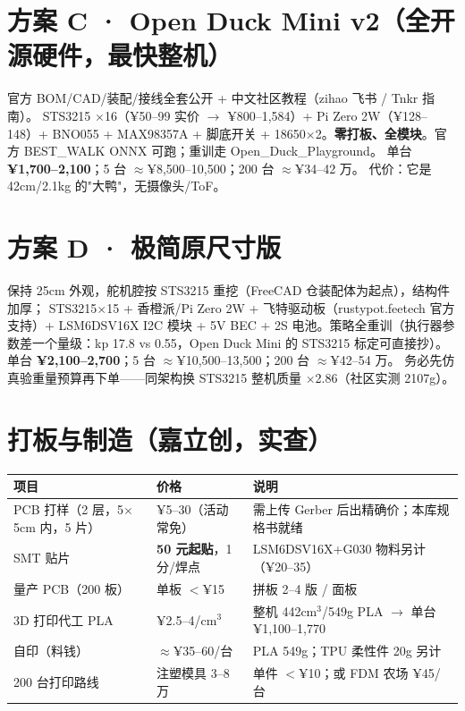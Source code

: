 \documentclass[11pt,a4paper]{ctexart}
\newcommand{\warn}[1]{\textcolor{orange!85!black}{#1}}
\begin{document}
\section{方案 C · Open Duck Mini v2（全开源硬件，最快整机）}

官方 BOM/CAD/装配/接线全套公开 + 中文社区教程（zihao 飞书 / Tnkr 指南）。
STS3215 $\times$16（¥50--99 实价 $\to$ ¥800--1,584）+ Pi Zero 2W（¥128--148）+ BNO055 + MAX98357A +
脚底开关 + 18650$\times$2。\textbf{零打板、全模块}。官方 BEST\_WALK ONNX 可跑；重训走 Open\_Duck\_Playground。
单台 \textbf{¥1,700--2,100}；5 台 $\approx$¥8,500--10,500；200 台 $\approx$¥34--42 万。
代价：它是 42cm/2.1kg 的"大鸭"，无摄像头/ToF。

\section{方案 D · 极简原尺寸版}

保持 25cm 外观，舵机腔按 STS3215 重挖（FreeCAD 仓装配体为起点），结构件加厚；
STS3215$\times$15 + 香橙派/Pi Zero 2W + 飞特驱动板（rustypot.feetech 官方支持）+ LSM6DSV16X I2C 模块 +
5V BEC + 2S 电池。策略全重训（执行器参数差一个量级：kp 17.8 vs 0.55，Open Duck Mini 的
STS3215 标定可直接抄）。单台 \textbf{¥2,100--2,700}；5 台 $\approx$¥10,500--13,500；200 台 $\approx$¥42--54 万。
\warn{务必先仿真验重量预算再下单}——同架构换 STS3215 整机质量 $\times$2.86（社区实测 2107g）。

\section{打板与制造（嘉立创，实查）}

\begin{longtable}{L{5.2cm}L{4.2cm}L{5.4cm}}
\toprule
\textbf{项目} & \textbf{价格} & \textbf{说明} \\
\midrule
PCB 打样（2 层，5$\times$5cm 内，5 片） & ¥5--30（活动常免） & 需上传 Gerber 后出精确价；本库规格书就绪 \\
SMT 贴片 & \textbf{50 元起贴}，1 分/焊点 & LSM6DSV16X+G030 物料另计（¥20--35） \\
量产 PCB（200 板） & 单板 $<$¥15 & 拼板 2--4 版 / 面板 \\
3D 打印代工 PLA & ¥2.5--4/cm$^3$ & 整机 442cm$^3$/549g PLA $\to$ 单台 ¥1,100--1,770 \\
自印（料钱） & $\approx$¥35--60/台 & PLA 549g；TPU 柔性件 20g 另计 \\
200 台打印路线 & 注塑模具 3--8 万 & 单件 $<$¥10；或 FDM 农场 ¥45/台 \\
\bottomrule
\end{longtable}
\end{document}
